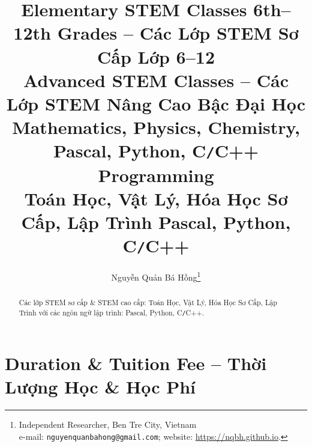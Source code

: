 \documentclass{article}
\title{Elementary STEM Classes 6th--12th Grades -- Các Lớp STEM Sơ Cấp Lớp 6--12\\Advanced STEM Classes -- Các Lớp STEM Nâng Cao Bậc Đại Học\\\vspace{5mm}Mathematics, Physics, Chemistry, Pascal, Python, C{\tt/}C++ Programming\\Toán Học, Vật Lý, Hóa Học Sơ Cấp, Lập Trình Pascal, Python, C{\tt/}C++}
\author{Nguyễn Quản Bá Hồng\footnote{Independent Researcher, Ben Tre City, Vietnam\\e-mail: \texttt{nguyenquanbahong@gmail.com}; website: \url{https://nqbh.github.io}.}}
\date{}
\numberwithin{equation}{section}
\begin{document}
\maketitle
\begin{abstract}
	Các lớp STEM sơ cấp \& STEM cao cấp: Toán Học, Vật Lý, Hóa Học Sơ Cấp, Lập Trình với các ngôn ngữ lập trình: Pascal, Python, C{\tt/}C++.
\end{abstract}
\setcounter{secnumdepth}{4}
\setcounter{tocdepth}{3}


\section{Duration \& Tuition Fee -- Thời Lượng Học \& Học Phí}
\end{document}
